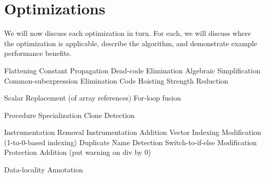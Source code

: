 \section{Optimizations}

We will now discuss each optimization in turn. For each, we will discuss where the optimization is applicable, describe the algorithm, and demonstrate example performance benefits.




Flattening
Constant Propagation
Dead-code Elimination
Algebraic Simplification
Common-subexpression Elimination
Code Hoisting
Strength Reduction

Scalar Replacement (of array references)
For-loop fusion

Procedure Specialization
Clone Detection

Instrumentation Removal
Instrumentation Addition
Vector Indexing Modification (1-to-0-based indexing)
Duplicate Name Detection
Switch-to-if-else Modification
Protection Addition (put warning on div by 0)

Data-locality Annotation

